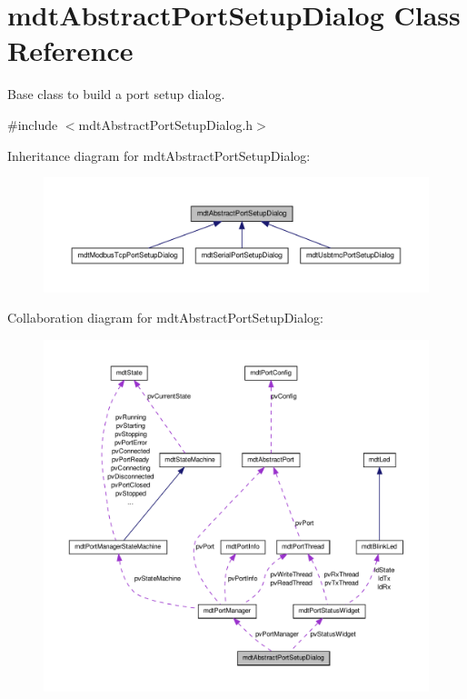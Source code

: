 \hypertarget{classmdt_abstract_port_setup_dialog}{
\section{mdtAbstractPortSetupDialog Class Reference}
\label{classmdt_abstract_port_setup_dialog}
}


Base class to build a port setup dialog.  




{\ttfamily \#include $<$mdtAbstractPortSetupDialog.h$>$}



Inheritance diagram for mdtAbstractPortSetupDialog:
\nopagebreak
\begin{figure}[H]
\begin{center}
\leavevmode
\includegraphics[width=400pt]{classmdt_abstract_port_setup_dialog__inherit__graph}
\end{center}
\end{figure}


Collaboration diagram for mdtAbstractPortSetupDialog:
\nopagebreak
\begin{figure}[H]
\begin{center}
\leavevmode
\includegraphics[width=400pt]{classmdt_abstract_port_setup_dialog__coll__graph}
\end{center}
\end{figure}
